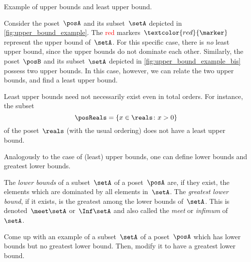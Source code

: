 \begin{marginfigure}
    \centering

    \caption{Example of upper bounds and least upper bound. }
    \label{fig:upper_bound_example_bis}
\end{marginfigure}

\begin{example}
    Consider the poset~$\posA$ and its subset~$\setA$ depicted in \cref{fig:upper_bound_example}.
    The \textcolor{red}{red} markers~$\textcolor{red}{\marker}$ represent the upper bound of~$\setA$.
    For this specific case, there is \emph{no} least upper bound, since the upper bounds do not dominate each other.
    Similarly, the poset~$\posB$ and its subset~$\setA$ depicted in \cref{fig:upper_bound_example_bis} possess two upper bounds.
    In this case, however, we can relate the two upper bounds, and find a least upper bound.

\end{example}

\begin{example}
    Least upper bounds need not necessarily exist even in total orders.
    For instance, the subset
    \begin{equation*}
        \posReals = \{x\in \reals \colon x>0\}
    \end{equation*}
    of the poset~$\reals$ (with the usual ordering) does not have a least upper bound.
\end{example}

Analogously to the case of (least) upper bounds, one can define lower bounds and greatest lower bounds.

\begin{ctdefinition}
    \label{def:greatest-lower-bound}
    The \emph{lower bounds} of a subset~$\setA$ of a poset~$\posA$ are, if they exist, the elements which are dominated by all elements in~$\setA$.
    The \emph{greatest lower bound}, if it exists, is the greatest among the lower bounds of~$\setA$.
    This is denoted~$\meet \setA$ or~$\Inf \setA$ and also called the \emph{meet} or \emph{infimum} of~$\setA$.
\end{ctdefinition}

\begin{exercise}
    Come up with an example of a subset~$\setA$ of a poset~$\posA$ which has lower bounds but no greatest lower bound.
    Then, modify it to have a greatest lower bound.
\end{exercise}

